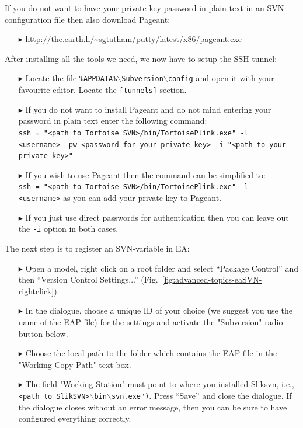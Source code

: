 If you do not want to have your private key password in plain text in an SVN configuration file then also download Pageant:
\begin{enumerate}
  \item[$\blacktriangleright$] {\small \url{http://the.earth.li/~sgtatham/putty/latest/x86/pageant.exe}}  
\end{enumerate}

After installing all the tools we need, we now have to setup the SSH tunnel:
   
\begin{enumerate}
  \item[$\blacktriangleright$] Locate the file \texttt{\%APPDATA\%$\backslash$Subversion$\backslash$config} and open it with your favourite editor. Locate the \texttt{[tunnels]} section.
  \item[$\blacktriangleright$] If you do not want to install Pageant and do not mind entering your password in plain text enter the following command:\\
  \texttt{ssh = "<path to Tortoise SVN>/bin/TortoisePlink.exe" -l \\<username> -pw <password for your private key> -i "<path to your private key>"}
  \item[$\blacktriangleright$] If you wish to use Pageant then the command can be simplified to:\\ \texttt{ssh = "<path to Tortoise SVN>/bin/TortoisePlink.exe" -l \\<username>} as you can add your private key to Pageant.
  \item[$\blacktriangleright$] If you just use direct passwords for authentication then you can leave out the \texttt{-i} option in both cases.
\end{enumerate}


The next step is to register an SVN-variable in EA:
\begin{enumerate}
  \item[$\blacktriangleright$] Open a model, right click on a root folder and select ``Package Control'' and then ``Version Control Settings...'' (Fig.~\ref{fig:advanced-topics-eaSVN-rightclick}).
  \item[$\blacktriangleright$] In the dialogue, choose a unique ID of your choice (we suggest you use the name of the EAP file) for the settings and activate the "Subversion" radio button below.
  \item[$\blacktriangleright$] Choose the local path to the folder which contains the EAP file in the "Working Copy Path" text-box.
  \item[$\blacktriangleright$] The field "Working Station" must point to where you installed Sliksvn, i.e., \texttt{<path to SlikSVN>$\backslash$bin$\backslash$svn.exe")}.  
  Press ``Save'' and close the dialogue.
  If the dialogue closes without an error message, then you can be sure to have configured everything correctly.
\end{enumerate}
 
